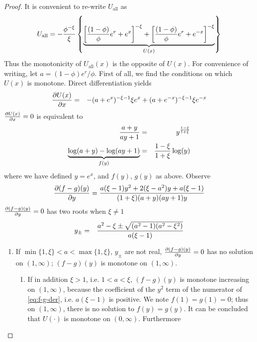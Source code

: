 \documentclass[11pt,a4]{amsart}
\newcommand{\pd}{\partial}
\newcommand{\1}{{\mathbf 1}}
\begin{document}
\begin{proof}
  It is convenient to re-write $U_{\text{all}}$ as
  \[
  U_{\text{all}} =
  -{\phi^{-\xi} \over \xi} \left\{
    \underbrace{
      \left[{(1 - \phi) \over \phi} e^r + e^x\right]^{-\xi}
      +
      \left[{(1 - \phi) \over \phi} e^r + e^{-x}\right]^{-\xi}
    }_{U(x)}
  \right\}
  \]
  Thus the monotonicity of $U_{\text{all}}(x)$ is the opposite of $U(x)$. For
  convenience of writing, let $a = (1 - \phi)e^r/\phi$.
  First of all, we find the conditions on which $U(x)$ is monotone.
  Direct differentiation yields
  \begin{eqnarray*}
    {\pd U(x) \over \pd x}
    &=&
    -{
      (a + e^x)^{-\xi - 1} \xi e^x
    } + (a + e^{-x})^{-\xi - 1} \xi e^{-x}
  \end{eqnarray*}
  ${\pd U(x) \over \pd x} = 0$ is equivalent to
  \begin{eqnarray*}
    {a + y \over a y + 1} &=& y^{1 -\xi \over 1+\xi} \\
    \underbrace{\log(a + y) - \log(a y + 1)}_{f(y)} &=&
    {1 -\xi \over 1+\xi} \log(y)
  \end{eqnarray*}
  where we have defined $y = e^x$, and $f(y)$, $g(y)$ as above. Observe
  \begin{equation}
    \label{eq:f-g-der}
    {\pd (f -g)(y) \over \pd y} = {
      a (\xi - 1) y^2 + 2 (\xi - a^2) y + a(\xi - 1)
      \over
      (1 + \xi) (a + y) (a y + 1) y
    }
  \end{equation}
  ${\pd (f -g)(y) \over \pd y} = 0$ has two roots when $\xi \ne 1$
  \begin{eqnarray*}
    y_\pm &=& {
      a^2 - \xi \pm \sqrt{(a^2 - 1) (a^2 - \xi^2)}
      \over
      a (\xi - 1)
    }
  \end{eqnarray*}
  \begin{enumerate}
  \item If $\min\{1, \xi\} < a < \max\{1, \xi\}$, $y_\pm$ are not
    real, ${\pd (f -g)(y) \over \pd y} = 0$ has no solution on
    $(1, \infty)$; $(f -g)(y)$ is monotone on $(1, \infty)$.
    \begin{enumerate}
    \item If in addition $\xi > 1$, i.e. $1 < a < \xi$, $(f - g)(y)$
      is monotone increasing on $(1, \infty)$, because the
      coefficient of the $y^2$ term of the numerator of
      \eqref{eq:f-g-der}, i.e. $a (\xi - 1)$ is positive. We note
      $f(1) = g(1) = 0$; thus on $(1, \infty)$, there is no solution
      to $f(y) = g(y)$. It can be concluded that $U(\cdot)$ is
      monotone on $(0, \infty)$. Furthermore

\end{enumerate}
\end{enumerate}
\end{proof}
\end{document}

